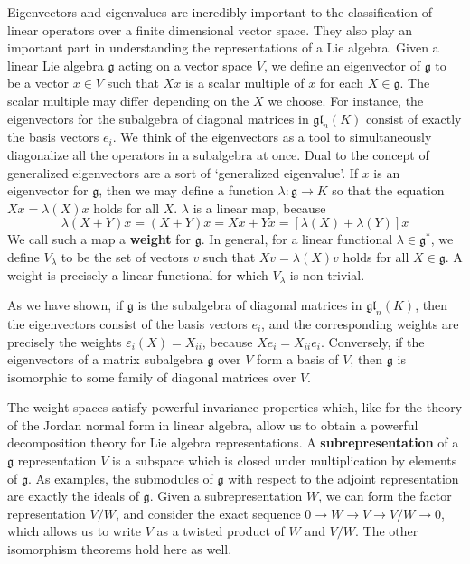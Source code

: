 Eigenvectors and eigenvalues are incredibly important to the classification of linear operators over a finite dimensional vector space. They also play an important part in understanding the representations of a Lie algebra. Given a linear Lie algebra $\mathfrak{g}$ acting on a vector space $V$, we define an eigenvector of $\mathfrak{g}$ to be a vector $x \in V$ such that $Xx$ is a scalar multiple of $x$ for each $X \in \mathfrak{g}$. The scalar multiple may differ depending on the $X$ we choose. For instance, the eigenvectors for the subalgebra of diagonal matrices in $\mathfrak{gl}_n(K)$ consist of exactly the basis vectors $e_i$. We think of the eigenvectors as a tool to simultaneously diagonalize all the operators in a subalgebra at once. Dual to the concept of generalized eigenvectors are a sort of `generalized eigenvalue'. If $x$ is an eigenvector for $\mathfrak{g}$, then we may define a function $\lambda: \mathfrak{g} \to K$ so that the equation $Xx = \lambda(X)x$ holds for all $X$. $\lambda$ is a linear map, because
%
\[ \lambda(X + Y)x = (X + Y)x = Xx + Yx = [\lambda(X) + \lambda(Y)]x \]
%
We call such a map a {\bf weight} for $\mathfrak{g}$. In general, for a linear functional $\lambda \in \mathfrak{g}^*$, we define $V_\lambda$ to be the set of vectors $v$ such that $Xv = \lambda(X)v$ holds for all $X \in \mathfrak{g}$. A weight is precisely a linear functional for which $V_\lambda$ is non-trivial.

\begin{example}
    As we have shown, if $\mathfrak{g}$ is the subalgebra of diagonal matrices in $\mathfrak{gl}_n(K)$, then the eigenvectors consist of the basis vectors $e_i$, and the corresponding weights are precisely the weights $\varepsilon_i(X) = X_{ii}$, because $Xe_i = X_{ii} e_i$. Conversely, if the eigenvectors of a matrix subalgebra $\mathfrak{g}$ over $V$ form a basis of $V$, then $\mathfrak{g}$ is isomorphic to some family of diagonal matrices over $V$.
\end{example}

The weight spaces satisfy powerful invariance properties which, like for the theory of the Jordan normal form in linear algebra, allow us to obtain a powerful decomposition theory for Lie algebra representations. A {\bf subrepresentation} of a $\mathfrak{g}$ representation $V$ is a subspace which is closed under multiplication by elements of $\mathfrak{g}$. As examples, the submodules of $\mathfrak{g}$ with respect to the adjoint representation are exactly the ideals of $\mathfrak{g}$. Given a subrepresentation $W$, we can form the factor representation $V/W$, and consider the exact sequence $0 \to W \to V \to V/W \to 0$, which allows us to write $V$ as a twisted product of $W$ and $V/W$. The other isomorphism theorems hold here as well.

